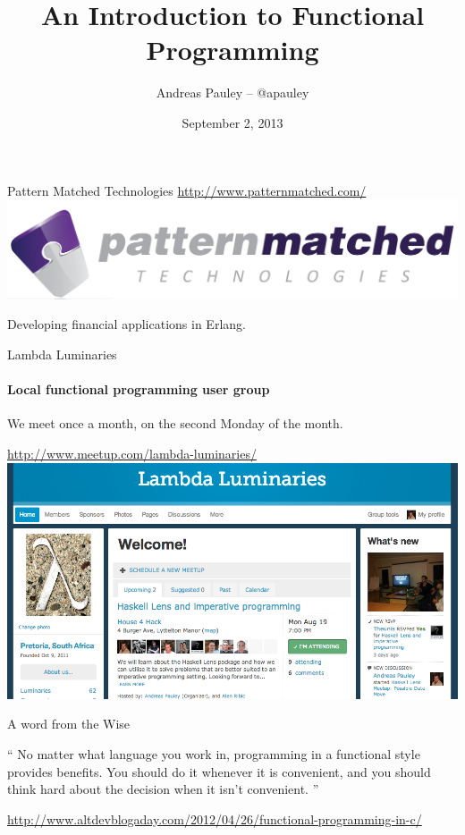 \documentclass{beamer}
\title[Functional Programming]{An Introduction to Functional Programming}
\author{Andreas Pauley -- @apauley}
\institute{Pattern Matched Technologies\\Lambda Luminaries}
\date{September 2, 2013}
\begin{document}
\begin{frame}
\titlepage
\end{frame}

\begin{frame}{Pattern Matched Technologies}
\url{http://www.patternmatched.com/}
\includegraphics[scale=0.21]{img/pmt-logo.png}

Developing financial applications in Erlang.
\end{frame}

\begin{frame}{Lambda Luminaries}
\framesubtitle{Local functional programming user group}
We meet once a month, on the second Monday of the month.

\url{http://www.meetup.com/lambda-luminaries/}
\includegraphics[scale=0.3]{img/LambdaLuminariesScreenShot2013-08-09.png}

\end{frame}

\begin{frame}{A word from the Wise}

\begin{exampleblock}{}
  {\large ``
No matter what language you work in, programming
in a functional style provides benefits.
You should do it whenever it is convenient, and you
should think hard about the decision when it isn’t convenient.
  ''}
  \vskip5mm
  \hspace*{}
\end{exampleblock}


\url{http://www.altdevblogaday.com/2012/04/26/functional-programming-in-c/}

\end{frame}
\end{document}

